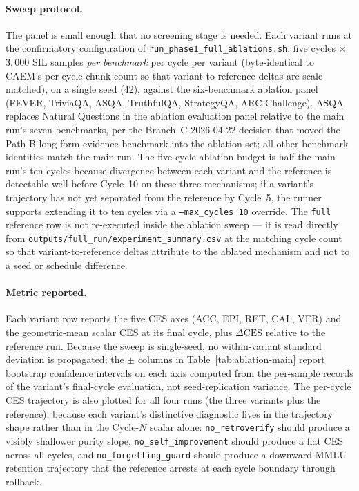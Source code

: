 \paragraph{Sweep protocol.}
The panel is small enough that no screening stage is needed. Each variant runs at the confirmatory configuration of \texttt{run\_phase1\_full\_ablations.sh}: five cycles $\times$ $3{,}000$ SIL samples \emph{per benchmark} per cycle per variant (byte-identical to CAEM's per-cycle chunk count so that variant-to-reference deltas are scale-matched), on a single seed (42), against the six-benchmark ablation panel (FEVER, TriviaQA, ASQA, TruthfulQA, StrategyQA, ARC-Challenge). ASQA replaces Natural Questions in the ablation evaluation panel relative to the main run's seven benchmarks, per the Branch~C 2026-04-22 decision that moved the Path-B long-form-evidence benchmark into the ablation set; all other benchmark identities match the main run. The five-cycle ablation budget is half the main run's ten cycles because divergence between each variant and the reference is detectable well before Cycle~10 on these three mechanisms; if a variant's trajectory has not yet separated from the reference by Cycle~5, the runner supports extending it to ten cycles via a \texttt{--max\_cycles 10} override. The \texttt{full} reference row is not re-executed inside the ablation sweep --- it is read directly from \texttt{outputs/full\_run/experiment\_summary.csv} at the matching cycle count so that variant-to-reference deltas attribute to the ablated mechanism and not to a seed or schedule difference.

\paragraph{Metric reported.}
Each variant row reports the five CES axes (ACC, EPI, RET, CAL, VER) and the geometric-mean scalar CES at its final cycle, plus $\Delta\text{CES}$ relative to the reference run. Because the sweep is single-seed, no within-variant standard deviation is propagated; the $\pm$ columns in Table~\ref{tab:ablation-main} report bootstrap confidence intervals on each axis computed from the per-sample records of the variant's final-cycle evaluation, not seed-replication variance. The per-cycle CES trajectory is also plotted for all four runs (the three variants plus the reference), because each variant's distinctive diagnostic lives in the trajectory shape rather than in the Cycle-$N$ scalar alone: \texttt{no\_retroverify} should produce a visibly shallower purity slope, \texttt{no\_self\_improvement} should produce a flat CES across all cycles, and \texttt{no\_forgetting\_guard} should produce a downward MMLU retention trajectory that the reference arrests at each cycle boundary through rollback.

